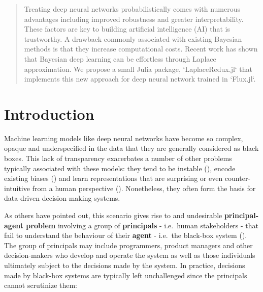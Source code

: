 \documentclass{juliacon}
\begin{document}


\maketitle

\begin{abstract}

Treating deep neural networks probabilistically comes with numerous advantages including improved robustness and greater interpretability. These factors are key to building artificial intelligence (AI) that is trustworthy. A drawback commonly associated with existing Bayesian methods is that they increase computational costs. Recent work has shown that Bayesian deep learning can be effortless through Laplace approximation. We propose a small Julia package, `LaplaceRedux.jl` that implements this new approach for deep neural network trained in `Flux.jl`.

\end{abstract}

\hypertarget{sec-intro}{%
\section{Introduction}\label{sec-intro}}

Machine learning models like deep neural networks have become so
complex, opaque and underspecified in the data that they are generally
considered as black boxes. This lack of transparency exacerbates a
number of other problems typically associated with these models: they
tend to be instable (\cite{goodfellow2014explaining}), encode existing
biases (\cite{buolamwini2018gender}) and learn representations that are
surprising or even counter-intuitive from a human perspective
(\cite{sturm2014simple}). Nonetheless, they often form the basis for
data-driven decision-making systems.

As others have pointed out, this scenario gives rise to and undesirable
\textbf{principal-agent problem} involving a group of
\textbf{principals} - i.e.~human stakeholders - that fail to understand
the behaviour of their \textbf{agent} - i.e.~the black-box system
(\cite{borch2022machine}). The group of principals may include
programmers, product managers and other decision-makers who develop and
operate the system as well as those individuals ultimately subject to
the decisions made by the system. In practice, decisions made by
black-box systems are typically left unchallenged since the principals
cannot scrutinize them:
\end{document}
